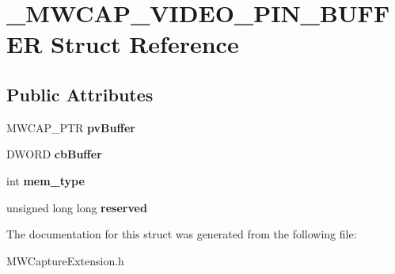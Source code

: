 \hypertarget{struct__MWCAP__VIDEO__PIN__BUFFER}{\section{\-\_\-\-M\-W\-C\-A\-P\-\_\-\-V\-I\-D\-E\-O\-\_\-\-P\-I\-N\-\_\-\-B\-U\-F\-F\-E\-R Struct Reference}
\label{struct__MWCAP__VIDEO__PIN__BUFFER}
}
\subsection*{Public Attributes}
\begin{DoxyCompactItemize}
\item 
\hypertarget{struct__MWCAP__VIDEO__PIN__BUFFER_ad31cee65781d6cf3297b297052c4ad4e}{M\-W\-C\-A\-P\-\_\-\-P\-T\-R {\bfseries pv\-Buffer}}\label{struct__MWCAP__VIDEO__PIN__BUFFER_ad31cee65781d6cf3297b297052c4ad4e}

\item 
\hypertarget{struct__MWCAP__VIDEO__PIN__BUFFER_aba5628d8a4f067c9646abb9362eb8500}{D\-W\-O\-R\-D {\bfseries cb\-Buffer}}\label{struct__MWCAP__VIDEO__PIN__BUFFER_aba5628d8a4f067c9646abb9362eb8500}

\item 
\hypertarget{struct__MWCAP__VIDEO__PIN__BUFFER_ac14a8c9b09314c4984eaaf6d0b8b2ac1}{int {\bfseries mem\-\_\-type}}\label{struct__MWCAP__VIDEO__PIN__BUFFER_ac14a8c9b09314c4984eaaf6d0b8b2ac1}

\item 
\hypertarget{struct__MWCAP__VIDEO__PIN__BUFFER_a2a2f1d6e53940f999400cce6310c44d9}{unsigned long long {\bfseries reserved}}\label{struct__MWCAP__VIDEO__PIN__BUFFER_a2a2f1d6e53940f999400cce6310c44d9}

\end{DoxyCompactItemize}


The documentation for this struct was generated from the following file\-:\begin{DoxyCompactItemize}
\item 
M\-W\-Capture\-Extension.\-h\end{DoxyCompactItemize}
